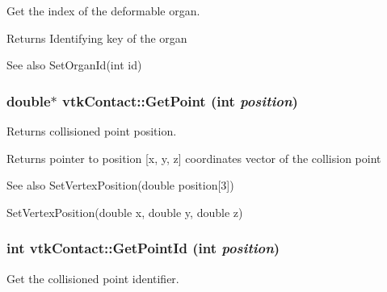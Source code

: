 Get the index of the deformable organ. 

\begin{DoxyReturn}{Returns}
Identifying key of the organ 
\end{DoxyReturn}
\begin{DoxySeeAlso}{See also}
SetOrganId(int id) 
\end{DoxySeeAlso}
\hypertarget{classvtkContact_a03931eb9be6db9e78e5228d7bc37996f}{
\subsubsection[{GetPoint}]{\setlength{\rightskip}{0pt plus 5cm}double$\ast$ vtkContact::GetPoint (int {\em position})}}
\label{classvtkContact_a03931eb9be6db9e78e5228d7bc37996f}


Returns collisioned point position. 

\begin{DoxyReturn}{Returns}
pointer to position \mbox{[}x, y, z\mbox{]} coordinates vector of the collision point 
\end{DoxyReturn}
\begin{DoxySeeAlso}{See also}
SetVertexPosition(double position\mbox{[}3\mbox{]}) 

SetVertexPosition(double x, double y, double z) 
\end{DoxySeeAlso}
\hypertarget{classvtkContact_a4b404cb999cbe287f2ea6c386e34d0fd}{
\subsubsection[{GetPointId}]{\setlength{\rightskip}{0pt plus 5cm}int vtkContact::GetPointId (int {\em position})}}
\label{classvtkContact_a4b404cb999cbe287f2ea6c386e34d0fd}


Get the collisioned point identifier. 


